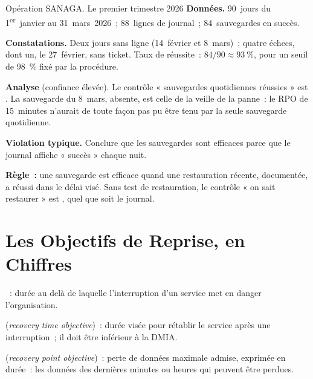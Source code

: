 \begin{boxscenario}{Opération SANAGA. Le premier trimestre 2026}
\textbf{Données.} 90~jours du 1\textsuperscript{er}~janvier au
31~mars~2026~; 88~lignes de journal~; 84~sauvegardes en succès.

\medskip
\textbf{Constatations.} Deux jours sans ligne (14~février et 8~mars)~;
quatre échecs, dont un, le 27~février, sans ticket. Taux de réussite~:
$84/90 \approx 93~\%$, pour un seuil de 98~\% fixé par la procédure.

\medskip
\textbf{Analyse} (confiance élevée). Le contrôle « sauvegardes quotidiennes
réussies » est \NON{}. La sauvegarde du 8~mars, absente, est celle de la
veille de la panne~: le RPO de 15~minutes n'aurait de toute façon pas pu
être tenu par la seule sauvegarde quotidienne.
\end{boxscenario}

\begin{boxalert}
\textbf{Violation typique.} Conclure que les sauvegardes sont efficaces
parce que le journal affiche « succès » chaque nuit.

\smallskip
\textbf{Règle~:} une sauvegarde est efficace quand une restauration
récente, documentée, a réussi dans le délai visé. Sans test de
restauration, le contrôle « on sait restaurer » est \NEK{}, quel que soit
le journal.
\end{boxalert}

\section{Les Objectifs de Reprise, en Chiffres}
\label{sec:c23-objectifs}

\begin{boxdef}
~: durée au
delà de laquelle l'interruption d'un service met en danger l'organisation.

\medskip
{} (\textit{recovery time objective})~: durée visée
pour rétablir le service après une interruption~; il doit être inférieur à
la DMIA.

\medskip
{} (\textit{recovery point objective})~: perte de
données maximale admise, exprimée en durée~: les données des dernières
minutes ou heures qui peuvent être perdues.
\end{boxdef}

